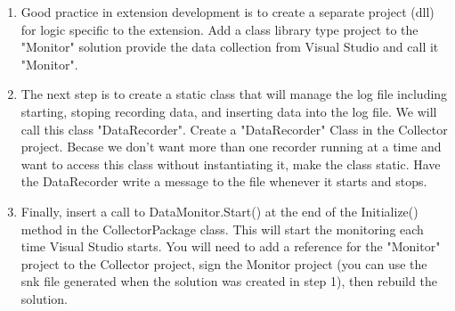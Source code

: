 \begin{Exercise}[type={program}, difficulty={1}]
\begin{enumerate}
\item
Good practice in extension development is to create a separate project (dll) for logic specific to the extension.  Add a class library type project to  the "Monitor" solution provide the data collection from Visual Studio and call it "Monitor".
\item
The next step is to create a static class that will manage the log file including starting, stoping recording data, and inserting data into the log file.  We will call this class "DataRecorder".   
Create a "DataRecorder" Class in the Collector project.  Becase we don't want more than one recorder running at a time and want to access this class without instantiating it, make the class static.  Have the DataRecorder write a message to the file whenever it starts and stops.
\item
Finally, insert a call to DataMonitor.Start() at the end of the Initialize() method in the CollectorPackage class.  This will start the monitoring each time Visual Studio starts.  You will need to add a reference for the "Monitor" project to the Collector project, sign the Monitor project (you can use the snk file generated when the solution was created in step 1), then rebuild the solution.
\end{enumerate}
\end{Exercise}



